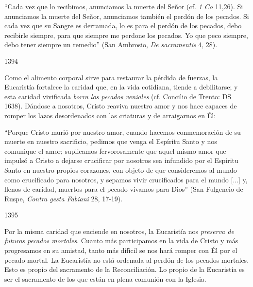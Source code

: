 			\begin{ccecite}“Cada vez que lo recibimos, anunciamos la muerte del Señor (cf. \textit{1 Co }11,26). Si anunciamos la muerte del Señor, anunciamos también el perdón de los pecados. Si cada vez que su Sangre es derramada, lo es para el perdón de los pecados, debo recibirle siempre, para que siempre me perdone los pecados. Yo que peco siempre, debo tener siempre un remedio” (San Ambrosio, \textit{De sacramentis} 4, 28).\end{ccecite}
			
			\begin{ccebody}\begin{ccenumber}1394\end{ccenumber} Como el alimento corporal sirve para restaurar la pérdida de fuerzas, la Eucaristía fortalece la caridad que, en la vida cotidiana, tiende a debilitarse; y esta caridad vivificada \textit{borra los pecados veniales} (cf. Concilio de Trento: DS 1638). Dándose a nosotros, Cristo reaviva nuestro amor y nos hace capaces de romper los lazos desordenados con las criaturas y de arraigarnos en Él:\end{ccebody}
			
			\begin{ccecite}“Porque Cristo murió por nuestro amor, cuando hacemos conmemoración de su muerte en nuestro sacrificio, pedimos que venga el Espíritu Santo y nos comunique el amor; suplicamos fervorosamente que aquel mismo amor que impulsó a Cristo a dejarse crucificar por nosotros sea infundido por el Espíritu Santo en nuestro propios corazones, con objeto de que consideremos al mundo como crucificado para nosotros, y sepamos vivir crucificados para el mundo [...] y, llenos de caridad, muertos para el pecado vivamos para Dios” (San Fulgencio de Ruspe, \textit{Contra gesta Fabiani} 28, 17-19).\end{ccecite}
			
			\begin{ccebody}\begin{ccenumber}1395\end{ccenumber} Por la misma caridad que enciende en nosotros, la Eucaristía nos \textit{preserva de futuros pecados mortales}. Cuanto más participamos en la vida de Cristo y más progresamos en su amistad, tanto más difícil se nos hará romper con Él por el pecado mortal. La Eucaristía no está ordenada al perdón de los pecados mortales. Esto es propio del sacramento de la Reconciliación. Lo propio de la Eucaristía es ser el sacramento de los que están en plena comunión con la Iglesia.\end{ccebody}
			

